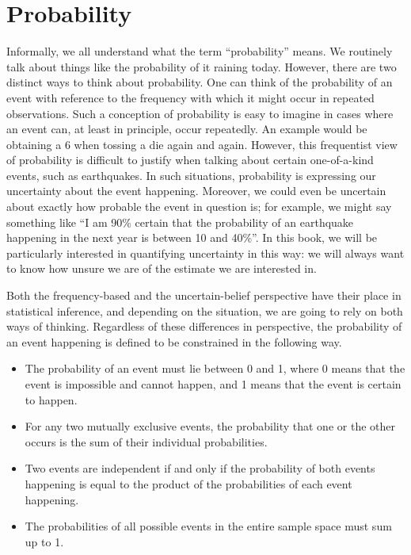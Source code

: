 \documentclass[12pt,]{krantz}
\providecommand{\tightlist}{%
  \setlength{\itemsep}{0pt}\setlength{\parskip}{0pt}}
\theoremstyle{definition}
\theoremstyle{definition}
\theoremstyle{definition}
\theoremstyle{remark}
\begin{document}
\section{Probability}\label{introprob}

Informally, we all understand what the term ``probability'' means. We
routinely talk about things like the probability of it raining today.
However, there are two distinct ways to think about probability. One can
think of the probability of an event with reference to the frequency
with which it might occur in repeated observations. Such a conception of
probability is easy to imagine in cases where an event can, at least in
principle, occur repeatedly. An example would be obtaining a 6 when
tossing a die again and again. However, this frequentist view of
probability is difficult to justify when talking about certain
one-of-a-kind events, such as earthquakes. In such situations,
probability is expressing our uncertainty about the event happening.
Moreover, we could even be uncertain about exactly how probable the
event in question is; for example, we might say something like ``I am
90\% certain that the probability of an earthquake happening in the next
year is between 10 and 40\%''. In this book, we will be particularly
interested in quantifying uncertainty in this way: we will always want
to know how unsure we are of the estimate we are interested in.

Both the frequency-based and the uncertain-belief perspective have their
place in statistical inference, and depending on the situation, we are
going to rely on both ways of thinking. Regardless of these differences
in perspective, the probability of an event happening is defined to be
constrained in the following way.

\begin{itemize}
\tightlist
\item
  The probability of an event must lie between 0 and 1, where 0 means
  that the event is impossible and cannot happen, and 1 means that the
  event is certain to happen.
\item
  For any two mutually exclusive events, the probability that one or the
  other occurs is the sum of their individual probabilities.
\item
  Two events are independent if and only if the probability of both
  events happening is equal to the product of the probabilities of each
  event happening.
\item
  The probabilities of all possible events in the entire sample space
  must sum up to 1.
\end{itemize}
\end{document}
